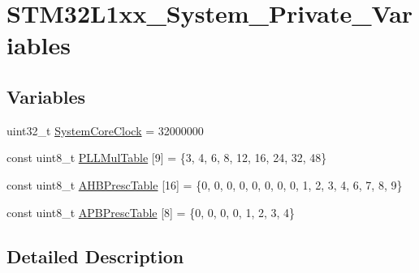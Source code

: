 \hypertarget{group___s_t_m32_l1xx___system___private___variables}{\section{S\-T\-M32\-L1xx\-\_\-\-System\-\_\-\-Private\-\_\-\-Variables}
\label{group___s_t_m32_l1xx___system___private___variables}
}
\subsection*{Variables}
\begin{DoxyCompactItemize}
\item 
uint32\-\_\-t \hyperlink{group___s_t_m32_l1xx___system___private___variables_gaa3cd3e43291e81e795d642b79b6088e6}{System\-Core\-Clock} = 32000000
\item 
const uint8\-\_\-t \hyperlink{group___s_t_m32_l1xx___system___private___variables_gadab2d89c9fe6053f421278d154dcfb9d}{P\-L\-L\-Mul\-Table} \mbox{[}9\mbox{]} = \{3, 4, 6, 8, 12, 16, 24, 32, 48\}
\item 
const uint8\-\_\-t \hyperlink{group___s_t_m32_l1xx___system___private___variables_ga6e1d9cd666f0eacbfde31e9932a93466}{A\-H\-B\-Presc\-Table} \mbox{[}16\mbox{]} = \{0, 0, 0, 0, 0, 0, 0, 0, 1, 2, 3, 4, 6, 7, 8, 9\}
\item 
const uint8\-\_\-t \hyperlink{group___s_t_m32_l1xx___system___private___variables_ga5b4f8b768465842cf854a8f993b375e9}{A\-P\-B\-Presc\-Table} \mbox{[}8\mbox{]} = \{0, 0, 0, 0, 1, 2, 3, 4\}
\end{DoxyCompactItemize}


\subsection{Detailed Description}


